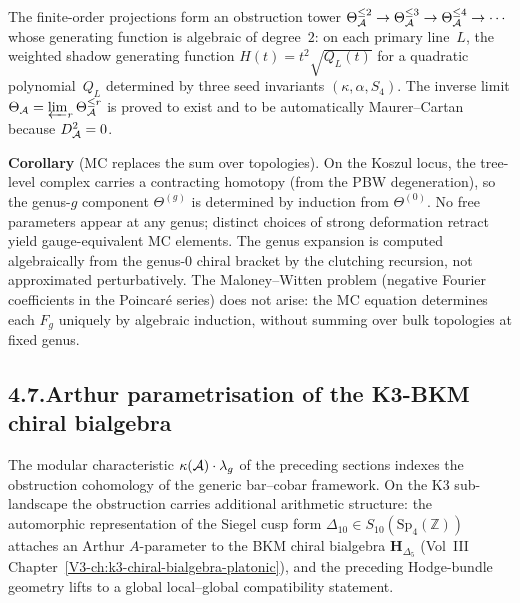 The finite-order projections form an obstruction tower
$\Theta_{\mathcal{A}}^{\leq 2} \to
\Theta_{\mathcal{A}}^{\leq 3} \to
\Theta_{\mathcal{A}}^{\leq 4} \to \cdots$
whose generating function is algebraic of degree~$2$: on each
primary line~$L$, the weighted shadow generating function
$H(t) = t^2\sqrt{Q_L(t)}$ for a quadratic polynomial~$Q_L$
determined by three seed invariants $(\kappa, \alpha, S_4)$.
The inverse limit
$\Theta_{\mathcal{A}} = \varprojlim_r \Theta_{\mathcal{A}}^{\leq r}$
is proved to exist and to be automatically Maurer--Cartan
because $D_{\mathcal{A}}^2 = 0$.

\medskip
\noindent\textbf{Corollary} (MC replaces the sum over topologies).
On the Koszul locus, the tree-level complex carries a contracting
homotopy (from the PBW degeneration), so the genus-$g$ component
$\Theta^{(g)}$ is determined by induction from $\Theta^{(0)}$. No
free parameters appear at any genus; distinct choices of strong
deformation retract yield gauge-equivalent MC elements. The genus
expansion is computed algebraically from the genus-$0$ chiral bracket
by the clutching recursion, not approximated perturbatively. The
Maloney--Witten problem (negative Fourier coefficients in the
Poincar\'e series) does not arise: the MC equation determines each
$F_g$ uniquely by algebraic induction, without summing over bulk
topologies at fixed genus.

\subsection*{4.7.\enspace Arthur parametrisation of the K3-BKM
chiral bialgebra}

The modular characteristic $\kappa(\mathcal{A}) \cdot \lambda_g$ of the
preceding sections indexes the obstruction cohomology of the generic
bar–cobar framework. On the K3 sub-landscape the obstruction carries
additional arithmetic structure: the automorphic representation of the
Siegel cusp form $\Delta_{10} \in S_{10}(\mathrm{Sp}_4(\mathbb{Z}))$
attaches an Arthur $A$-parameter to the BKM chiral bialgebra
$\mathbf{H}_{\Delta_5}$ (Vol~III
Chapter~\ref{V3-ch:k3-chiral-bialgebra-platonic}), and the preceding
Hodge-bundle geometry lifts to a global local--global compatibility
statement.

